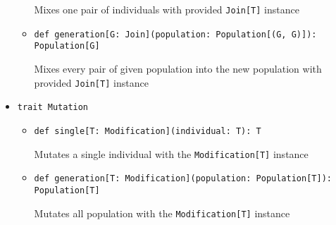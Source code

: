 \begin{itemize}
\begin{itemize}
	Mixes one pair of individuals with provided \texttt{Join[T]} instance 

	\item \texttt{def generation[G: Join](population: Population[(G, G)]): Population[G]}

	Mixes every pair of given population into the new population with provided \texttt{Join[T]} instance
\end{itemize}

\smallskip
\item \texttt{trait Mutation}
\begin{itemize}
	\item \texttt{def single[T: Modification](individual: T): T}

	Mutates a single individual with the \texttt{Modification[T]} instance 

	\item \texttt{def generation[T: Modification](population: Population[T]): Population[T]}

	Mutates all population with the \texttt{Modification[T]} instance
\end{itemize}

\end{itemize}



